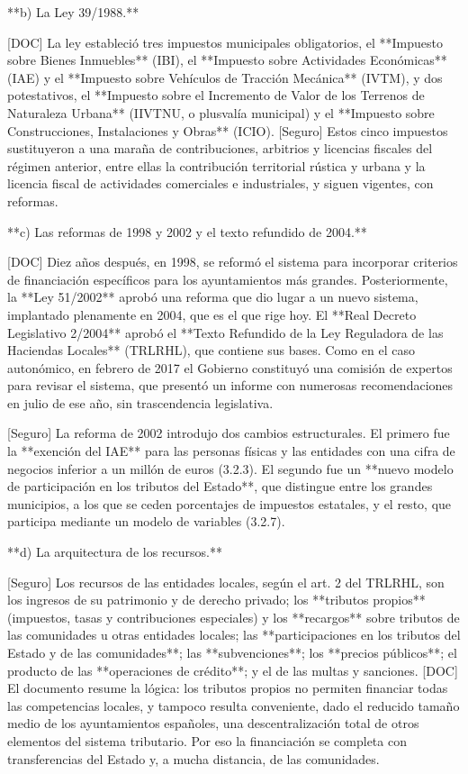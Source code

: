\documentclass[10pt,a4paper]{article}
\begin{document}
**b) La Ley 39/1988.**

[DOC] La ley estableció tres impuestos municipales obligatorios, el **Impuesto sobre Bienes Inmuebles** (IBI), el **Impuesto sobre Actividades Económicas** (IAE) y el **Impuesto sobre Vehículos de Tracción Mecánica** (IVTM), y dos potestativos, el **Impuesto sobre el Incremento de Valor de los Terrenos de Naturaleza Urbana** (IIVTNU, o plusvalía municipal) y el **Impuesto sobre Construcciones, Instalaciones y Obras** (ICIO). [Seguro] Estos cinco impuestos sustituyeron a una maraña de contribuciones, arbitrios y licencias fiscales del régimen anterior, entre ellas la contribución territorial rústica y urbana y la licencia fiscal de actividades comerciales e industriales, y siguen vigentes, con reformas.

**c) Las reformas de 1998 y 2002 y el texto refundido de 2004.**

[DOC] Diez años después, en 1998, se reformó el sistema para incorporar criterios de financiación específicos para los ayuntamientos más grandes. Posteriormente, la **Ley 51/2002** aprobó una reforma que dio lugar a un nuevo sistema, implantado plenamente en 2004, que es el que rige hoy. El **Real Decreto Legislativo 2/2004** aprobó el **Texto Refundido de la Ley Reguladora de las Haciendas Locales** (TRLRHL), que contiene sus bases. Como en el caso autonómico, en febrero de 2017 el Gobierno constituyó una comisión de expertos para revisar el sistema, que presentó un informe con numerosas recomendaciones en julio de ese año, sin trascendencia legislativa.

[Seguro] La reforma de 2002 introdujo dos cambios estructurales. El primero fue la **exención del IAE** para las personas físicas y las entidades con una cifra de negocios inferior a un millón de euros (3.2.3). El segundo fue un **nuevo modelo de participación en los tributos del Estado**, que distingue entre los grandes municipios, a los que se ceden porcentajes de impuestos estatales, y el resto, que participa mediante un modelo de variables (3.2.7).

**d) La arquitectura de los recursos.**

[Seguro] Los recursos de las entidades locales, según el art. 2 del TRLRHL, son los ingresos de su patrimonio y de derecho privado; los **tributos propios** (impuestos, tasas y contribuciones especiales) y los **recargos** sobre tributos de las comunidades u otras entidades locales; las **participaciones en los tributos del Estado y de las comunidades**; las **subvenciones**; los **precios públicos**; el producto de las **operaciones de crédito**; y el de las multas y sanciones. [DOC] El documento resume la lógica: los tributos propios no permiten financiar todas las competencias locales, y tampoco resulta conveniente, dado el reducido tamaño medio de los ayuntamientos españoles, una descentralización total de otros elementos del sistema tributario. Por eso la financiación se completa con transferencias del Estado y, a mucha distancia, de las comunidades.
\end{document}
